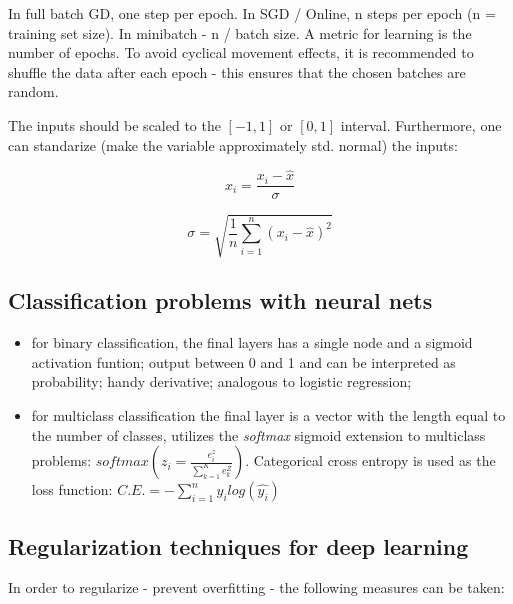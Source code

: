 \documentclass[11pt]{book}
\begin{document}
In full batch GD, one step per epoch. In SGD / Online, n steps per epoch (n = training set size). In minibatch - n / batch size. A metric for learning is the number of epochs. To avoid cyclical movement effects, it is recommended to shuffle the data after each epoch - this ensures that the chosen batches are random.  

The inputs should be scaled to the $[-1, 1]$ or $[0, 1]$ interval. Furthermore, one can standarize (make the variable approximately std. normal) the inputs:

\begin{equation}
x_{i} = \frac{x_i - \hat{x}}{\sigma}
\end{equation}

\begin{equation}
\sigma = \sqrt{ \frac{1}{n} \sum_{i=1}^{n} (x_i - \hat{x})^2}
\end{equation}



\subsection{Classification problems with neural nets}

\begin{itemize}
\item for binary classification, the final layers has a single node and a sigmoid activation funtion; output between 0 and 1 and can be interpreted as probability; handy derivative; analogous to logistic regression;
\item for multiclass classification the final layer is a vector with the length equal to the number of classes, utilizes the \textit{softmax} sigmoid extension to multiclass problems: $softmax(z_{i} = \frac{e^{z}_{i}}{\sum_{k=1}^{K} e^{Z}_k})$. Categorical cross entropy is used as the loss function: $C.E. = - \sum_{i=1}^{n} y_{i} log(\hat{y_{i}})$

\end{itemize}

\subsection{Regularization techniques for deep learning}

In order to regularize - prevent overfitting - the following measures can be taken:
\end{document}
